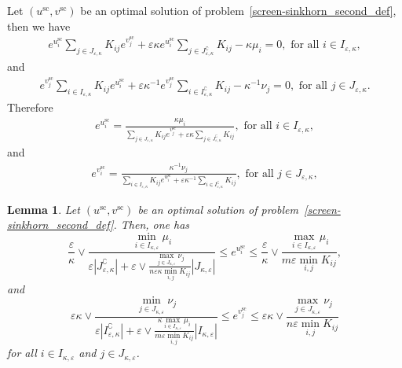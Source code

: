 \documentclass{article}
\newtheorem{lemma}{Lemma}
\begin{document}
Let $(u^{\text{sc}}, v^{\text{sc}})$ be an optimal solution of problem~\eqref{screen-sinkhorn_second_def}, then we have 
\begin{align*}
e^{u^{\text{sc}}_i} \sum_{j\in J_{\varepsilon,\kappa}}K_{ij}e^{v^{\text{sc}}_j} + \varepsilon\kappa e^{u^{\text{sc}}_i}\sum_{j\in J^\complement_{\varepsilon,\kappa}}K_{ij} - \kappa \mu_i = 0, \text{ for all } i \in I_{\varepsilon,\kappa},
\end{align*}
and 
\begin{align*}
e^{v^{\text{sc}}_j} \sum_{i\in I_{\varepsilon,\kappa}}K_{ij}e^{u^{\text{sc}}_i} + \varepsilon\kappa^{-1} e^{v^{\text{sc}}_j}\sum_{i\in I^\complement_{\varepsilon,\kappa}}K_{ij} - \kappa^{-1} \nu_j = 0, \text{ for all } j \in J_{\varepsilon,\kappa}.
\end{align*}
Therefore
\begin{align*}
e^{u^{\text{sc}}_i} = \frac{\kappa\mu_i}{\sum_{j\in J_{\varepsilon,\kappa}}K_{ij}e^{v^{\text{sc}}_j} + \varepsilon\kappa \sum_{j\in J^\complement_{\varepsilon,\kappa}}K_{ij}}, \text{ for all } i \in I_{\varepsilon,\kappa},
\end{align*}
and 
\begin{align*}
e^{v^{\text{sc}}_i} = \frac{\kappa^{-1}\nu_j}{\sum_{i \in I_{\varepsilon,\kappa}}K_{ij}e^{u^{\text{sc}}_i} + \varepsilon\kappa^{-1} \sum_{i\in I^\complement_{\varepsilon,\kappa}}K_{ij}}, \text{ for all } j \in J_{\varepsilon,\kappa},
\end{align*}




\begin{lemma}
Let $(u^{\text{sc}}, v^{\text{sc}})$ be an optimal solution of problem~\eqref{screen-sinkhorn_second_def}. Then,
one has
\begin{equation}
\label{bound_on_u}
\frac \varepsilon\kappa \vee \frac{\min_{i \in I_{\kappa,\varepsilon}}\mu_i}{\varepsilon |J^\complement_{\varepsilon,\kappa}| + \varepsilon \vee \frac{\max_{j\in J_{\kappa,\varepsilon}} \nu_j}{n\varepsilon\kappa\min_{i,j}K_{ij}} |J_{\kappa,\varepsilon}|} \leq e^{u^{\text{sc}}_i} \leq \frac \varepsilon\kappa\vee \frac{\max_{i \in I_{\kappa,\varepsilon}} \mu_i}{m\varepsilon\min_{i,j}K_{ij}},
\end{equation}
and
\begin{equation}
\label{bound_on_v}
\varepsilon\kappa \vee \frac{\min_{j \in J_{\kappa,\varepsilon}}\nu_j}{\varepsilon|I^\complement_{\varepsilon,\kappa}| + \varepsilon \vee \frac{\kappa\max_{i\in I_{\kappa,\varepsilon}} \mu_i}{m\varepsilon\min_{i,j}K_{ij}} |I_{\kappa,\varepsilon}|} \leq e^{v^{\text{sc}}_j} \leq \varepsilon\kappa \vee \frac{\max_{j \in J_{\kappa,\varepsilon}} \nu_j}{n\varepsilon\min_{i,j}K_{ij}}
\end{equation}
for all $i\in I_{\kappa,\varepsilon}$ and $j\in J_{\kappa,\varepsilon}$.
\end{lemma}
\end{document}

